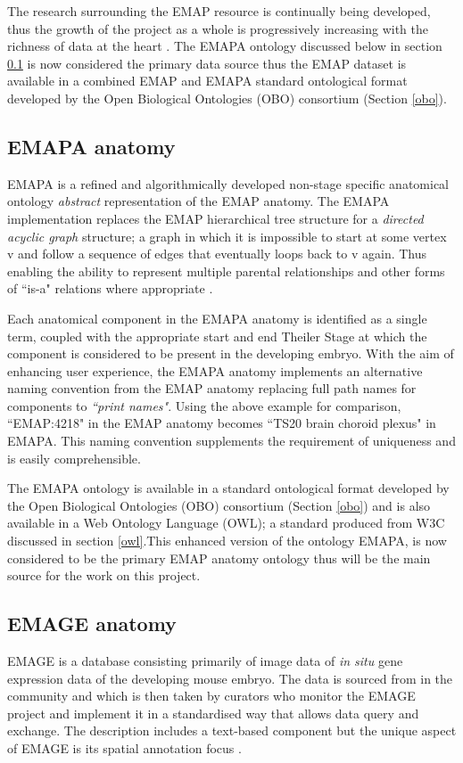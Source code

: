 The research surrounding the EMAP resource is continually being developed, thus the growth of the project as a whole is progressively increasing with the richness of data at the heart \cite{emap}. The EMAPA ontology discussed below in section \ref{emapaanatomy} is now considered the primary data source thus the EMAP dataset is available in a combined EMAP and EMAPA standard ontological format developed by the Open Biological Ontologies (OBO) consortium (Section \ref{obo}).

\subsection{EMAPA anatomy}\label{emapaanatomy}
EMAPA is a refined and algorithmically developed non-stage specific anatomical ontology \textit{abstract} representation of the EMAP anatomy. The EMAPA implementation replaces the EMAP hierarchical tree structure for a \textit{directed acyclic graph} structure; a graph in which it is impossible to start at some vertex v and follow a sequence of edges that eventually loops back to v again. Thus enabling the ability to represent multiple parental relationships and other forms of ``is-a" relations where appropriate \cite{emap}.

Each anatomical component in the EMAPA anatomy is identified as a single term, coupled with the appropriate start and end Theiler Stage at which the component is considered to be present in the developing embryo. \cite{emap} With the aim of enhancing user experience, the EMAPA anatomy  implements an alternative naming convention from the EMAP anatomy replacing full path names for components to \textit{``print names"}. Using the above example for comparison, ``EMAP:4218" in the EMAP anatomy becomes ``TS20 brain choroid plexus" in EMAPA. This naming convention supplements the requirement of uniqueness and is easily comprehensible.

The EMAPA ontology is available in a standard ontological format developed by the Open Biological Ontologies (OBO) consortium (Section \ref{obo}) and is also available in a Web Ontology Language (OWL); a standard produced from W3C discussed in section \ref{owl}.This enhanced version of the ontology EMAPA, is now considered to be the primary EMAP anatomy ontology thus will be the main source for the work on this project.

\subsection{EMAGE anatomy}
EMAGE is a database consisting primarily of image data of \textit{in situ} gene expression data of the developing mouse embryo. The data is sourced from in the community and which is then taken by curators who monitor the EMAGE project and implement it in a standardised way that allows data query and exchange. The description includes a text-based component but the unique aspect of EMAGE is its spatial annotation focus \cite{emap}.

